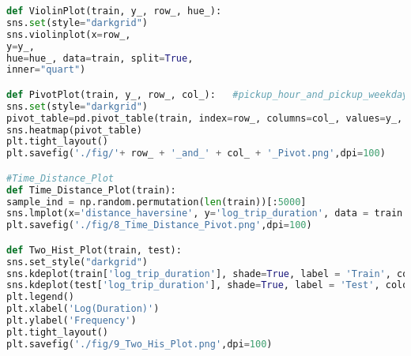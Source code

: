 \documentclass[12pt,report]{ucdavisthesis}
\begin{document}
\begin{lstlisting}[language=Python, caption=code3]
def ViolinPlot(train, y_, row_, hue_):
sns.set(style="darkgrid")
sns.violinplot(x=row_, 
y=y_, 
hue=hue_, data=train, split=True,
inner="quart")

def PivotPlot(train, y_, row_, col_):   #pickup_hour_and_pickup_weekday_Pivot 
sns.set(style="darkgrid")
pivot_table=pd.pivot_table(train, index=row_, columns=col_, values=y_, aggfunc=np.mean)
sns.heatmap(pivot_table)
plt.tight_layout()
plt.savefig('./fig/'+ row_ + '_and_' + col_ + '_Pivot.png',dpi=100)

#Time_Distance_Plot   
def Time_Distance_Plot(train): 
sample_ind = np.random.permutation(len(train))[:5000]
sns.lmplot(x='distance_haversine', y='log_trip_duration', data = train.iloc[sample_ind], scatter_kws={"s": 10})   
plt.savefig('./fig/8_Time_Distance_Pivot.png',dpi=100)

def Two_Hist_Plot(train, test):
sns.set_style("darkgrid")
sns.kdeplot(train['log_trip_duration'], shade=True, label = 'Train', color = 'b')
sns.kdeplot(test['log_trip_duration'], shade=True, label = 'Test', color = 'r')
plt.legend()
plt.xlabel('Log(Duration)')
plt.ylabel('Frequency')
plt.tight_layout()
plt.savefig('./fig/9_Two_His_Plot.png',dpi=100)            
\end{lstlisting}
\end{document}

